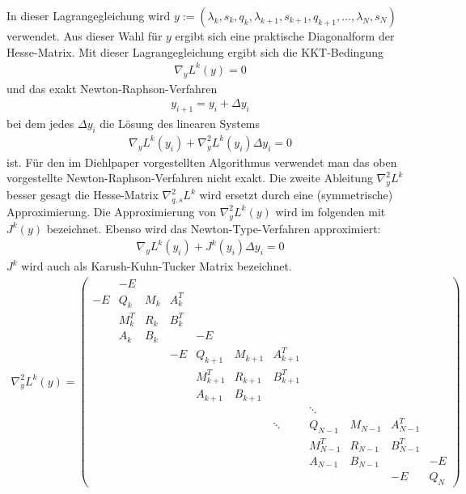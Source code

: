 \documentclass[12pt,a4paper]{article}
\begin{document}
  In dieser Lagrangegleichung wird $ y := (\lambda_{k},s_{k},q_{k},\lambda_{k+1},s_{k+1},q_{k+1}, ...,\lambda_{N},s_{N}) $ verwendet. Aus dieser Wahl für $ y $ ergibt sich eine praktische Diagonalform der Hesse-Matrix.
  Mit dieser Lagrangegleichung ergibt sich die KKT-Bedingung
  \begin{align*}
  \nabla_{y} L^{k}(y)  = 0
  \end{align*}
  und das exakt Newton-Raphson-Verfahren
  \begin{align*}
  y_{i+1} = y_i + \Delta y_i
  \end{align*}
  bei dem jedes $ \Delta y_i $ die Lösung des linearen Systems
  \begin{align*} 
  \nabla_{y} L^{k}(y_{i}) + \nabla_{y}^{2} L^{k}(y_{i}) \Delta y_{i} = 0
  \end{align*}
  ist.
  Für den im Diehlpaper vorgestellten Algorithmus verwendet man das oben vorgestellte Newton-Raphson-Verfahren nicht exakt. Die zweite Ableitung $ \nabla^{2}_{y} L^{k} $ besser gesagt die Hesse-Matrix $ \nabla^{2}_{q,s} L^{k} $ wird ersetzt durch eine (symmetrische) Approximierung. Die Approximierung von $ \nabla^{2}_{y} L^{k}(y) $ wird im folgenden mit $ J^{k}(y) $ bezeichnet. Ebenso wird das Newton-Type-Verfahren approximiert:
  \begin{align*} 
  \nabla_{y} L^{k}(y_{i}) + J^{k}(y_{i}) \Delta y_{i} = 0
  \end{align*}
  $ J^{k} $ wird auch als Karush-Kuhn-Tucker Matrix bezeichnet.\\
  \begin{align*} 
  \nabla_{y}^{2} L^{k}(y) =
  \begin{pmatrix}
    & -E  &     &     &     &     &     &     &     &     &     \\
-E  & Q_k & M_k & A_k^{T} &  &    &     &     &     &     &     \\
    & M_k^{T} & R_k & B_k^{T} &   &    &    &    &    &   &     \\
    & A_k & B_k &     & -E  &     &     &     &     &     &     \\
    &  &  & -E  & Q_{k+1} & M_{k+1} & A_{k+1}^{T} &  &  &  &  \\
    &  &  &     & M_{k+1}^{T} & R_{k+1} & B_{k+1}^{T} &  &  &  &  \\
    &  &  &     & A_{k+1} & B_{k+1} &    &    &     &     &     \\
    &  &  &     &    &    &   & \ddots &     &     &     \\
    &  &  &   &  &  & \ddots & Q_{N-1} & M_{N-1} & A_{N-1}^{T} &  \\
    &  &  &   &  &  &    & M_{N-1}^{T} & R_{N-1} & B_{N-1}^{T} &  \\
    &  &  &   &  &  &    & A_{N-1}     & B_{N-1} &    & -E \\
    &  &  &     &    &    &     &      &     & -E &  Q_N 
\end{pmatrix}
  \end{align*}
\end{document}
